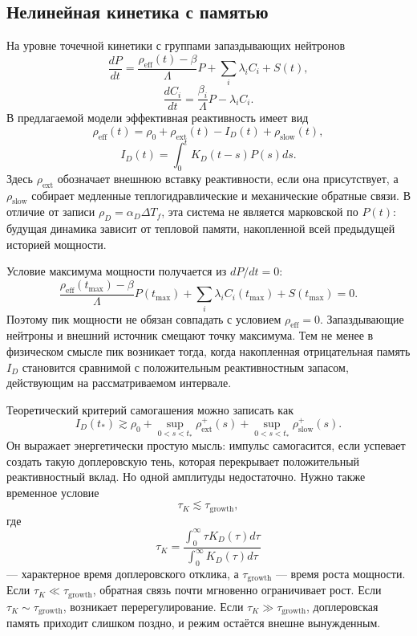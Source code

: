\documentclass[12pt]{article}
\begin{document}
\subsection{Нелинейная кинетика с памятью}

На уровне точечной кинетики с группами запаздывающих нейтронов \cite{DuderstadtHamilton1976}
\[
\frac{dP}{dt}
=
\frac{\rho_{\mathrm{eff}}(t)-\beta}{\Lambda}P
+
\sum_i\lambda_iC_i+S(t),
\]
\[
\frac{dC_i}{dt}
=
\frac{\beta_i}{\Lambda}P-\lambda_iC_i.
\]
В предлагаемой модели эффективная реактивность имеет вид
\[
\rho_{\mathrm{eff}}(t)
=
\rho_0+\rho_{\mathrm{ext}}(t)-I_D(t)+\rho_{\mathrm{slow}}(t),
\]
\[
I_D(t)=\int_0^tK_D(t-s)P(s)ds.
\]
Здесь \(\rho_{\mathrm{ext}}\) обозначает внешнюю вставку реактивности, если она присутствует, а \(\rho_{\mathrm{slow}}\) собирает медленные теплогидравлические и механические обратные связи. В отличие от записи \(\rho_D=\alpha_D\Delta T_f\), эта система не является марковской по \(P(t)\): будущая динамика зависит от тепловой памяти, накопленной всей предыдущей историей мощности.

Условие максимума мощности получается из \(dP/dt=0\):
\[
\frac{\rho_{\mathrm{eff}}(t_{\max})-\beta}{\Lambda}P(t_{\max})
+
\sum_i\lambda_iC_i(t_{\max})+S(t_{\max})=0.
\]
Поэтому пик мощности не обязан совпадать с условием \(\rho_{\mathrm{eff}}=0\). Запаздывающие нейтроны и внешний источник смещают точку максимума. Тем не менее в физическом смысле пик возникает тогда, когда накопленная отрицательная память \(I_D\) становится сравнимой с положительным реактивностным запасом, действующим на рассматриваемом интервале.

Теоретический критерий самогашения можно записать как
\[
\boxed{
I_D(t_*)
\gtrsim
\rho_0+
\sup_{0<s<t_*}\rho_{\mathrm{ext}}^+(s)
+
\sup_{0<s<t_*}\rho_{\mathrm{slow}}^+(s).
}
\]
Он выражает энергетически простую мысль: импульс самогасится, если успевает создать такую доплеровскую тень, которая перекрывает положительный реактивностный вклад. Но одной амплитуды недостаточно. Нужно также временное условие
\[
\tau_K\lesssim\tau_{\mathrm{growth}},
\]
где
\[
\tau_K
=
\frac{\int_0^\infty \tau K_D(\tau)d\tau}{\int_0^\infty K_D(\tau)d\tau}
\]
--- характерное время доплеровского отклика, а \(\tau_{\mathrm{growth}}\) --- время роста мощности. Если \(\tau_K\ll\tau_{\mathrm{growth}}\), обратная связь почти мгновенно ограничивает рост. Если \(\tau_K\sim\tau_{\mathrm{growth}}\), возникает перерегулирование. Если \(\tau_K\gg\tau_{\mathrm{growth}}\), доплеровская память приходит слишком поздно, и режим остаётся внешне вынужденным.
\end{document}
